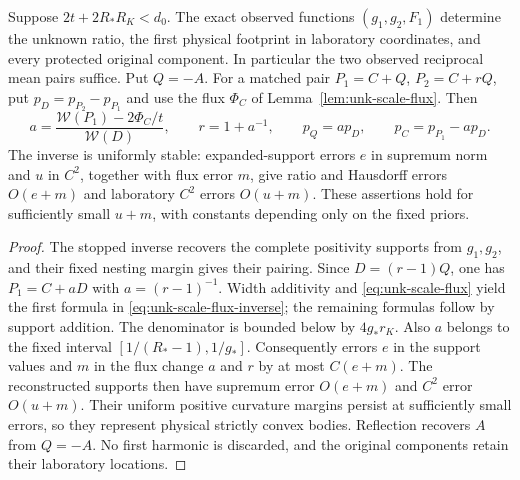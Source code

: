 \begin{theorem}
\label{thm:unk-scale-flux}
Suppose $2t+2R_*R_K<d_0$. The exact observed functions
$(g_1,g_2,F_1)$ determine the unknown ratio, the first physical
footprint in laboratory coordinates, and every protected original
component. In particular the two observed reciprocal mean pairs
suffice. Put $Q=-A$. For a matched pair $P_1=C+Q$, $P_2=C+rQ$, put
$p_D=p_{P_2}-p_{P_1}$ and use the flux $\Phi_C$ of
Lemma~\ref{lem:unk-scale-flux}. Then
\begin{equation}\label{eq:unk-scale-flux-inverse}
 a=\frac{\mathcal W(P_1)-2\Phi_C/t}{\mathcal W(D)},
 \qquad r=1+a^{-1},\qquad
 p_Q=a p_D,\qquad p_C=p_{P_1}-a p_D.
\end{equation}
The inverse is uniformly stable: expanded-support errors $e$ in
supremum norm and $u$ in $C^2$, together with flux error $m$, give
ratio and Hausdorff errors $O(e+m)$ and laboratory $C^2$ errors
$O(u+m)$. These assertions hold for sufficiently small $u+m$,
with constants depending only on the fixed priors.
\end{theorem}
\begin{proof}
The stopped inverse recovers the complete positivity supports from
$g_1,g_2$, and their fixed nesting margin gives their pairing.
Since $D=(r-1)Q$, one has $P_1=C+aD$ with $a=(r-1)^{-1}$.
Width additivity and \eqref{eq:unk-scale-flux} yield the first formula
in \eqref{eq:unk-scale-flux-inverse}; the remaining formulas follow
by support addition. The denominator is bounded below by $4g_*r_K$.
Also $a$ belongs to the fixed interval
$[1/(R_*-1),1/g_*]$. Consequently errors $e$ in the support values
and $m$ in the flux change $a$ and $r$ by at most $C(e+m)$.
The reconstructed supports then have supremum error $O(e+m)$ and
$C^2$ error $O(u+m)$. Their uniform positive curvature margins
persist at sufficiently small errors, so they represent physical
strictly convex bodies. Reflection recovers $A$ from $Q=-A$.
No first harmonic is discarded, and the original components retain
their laboratory locations.
\end{proof}

